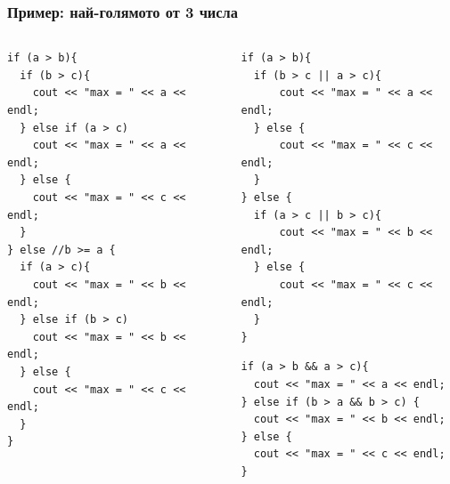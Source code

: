\documentclass{beamer}
\begin{document}
\begin{frame}[fragile]
\frametitle{Пример: най-голямото от 3 числа}


\begin{columns}[t]
  \begin{column}{0.3\textwidth}
\begin{lstlisting}
if (a > b){
  if (b > c){
    cout << "max = " << a << endl;
  } else if (a > c)
    cout << "max = " << a << endl;    
  } else {
    cout << "max = " << c << endl;
  }
} else //b >= a { 
  if (a > c){
    cout << "max = " << b << endl;
  } else if (b > c)
    cout << "max = " << b << endl;    
  } else {
    cout << "max = " << c << endl;
  }
}

\end{lstlisting}

  \end{column}

\pause
  \begin{column}{0.3\textwidth}
\begin{lstlisting}
if (a > b){
  if (b > c || a > c){
      cout << "max = " << a << endl;  
  } else {   
      cout << "max = " << c << endl;  
  }
} else {
  if (a > c || b > c){
      cout << "max = " << b << endl;  
  } else {   
      cout << "max = " << c << endl;  
  }  
}
\end{lstlisting}

\pause

\begin{lstlisting}
if (a > b && a > c){
  cout << "max = " << a << endl; 
} else if (b > a && b > c) {
  cout << "max = " << b << endl; 
} else {
  cout << "max = " << c << endl; 
}
\end{lstlisting}
  \end{column}
\end{columns}


\end{frame}
\end{document}
